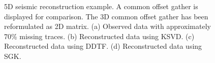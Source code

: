 \begin{figure}[htb!]
{  \label{fig:f5d-sgk}}
\caption{5D seismic reconstruction example. A common offset gather is displayed for comparison. The 3D common offset gather has been reformulated as 2D matrix. (a) Observed data with approximately 70\% missing traces. (b) Reconstructed data using KSVD. (c) Reconstructed data using DDTF. (d) Reconstructed data using SGK. }
\label{fig:f5d-obs,f5d-ksvd,f5d-ddtf,f5d-sgk}
\end{figure}


\begin{figure}[ht!]
\centering
{}
\\
\end{figure}
